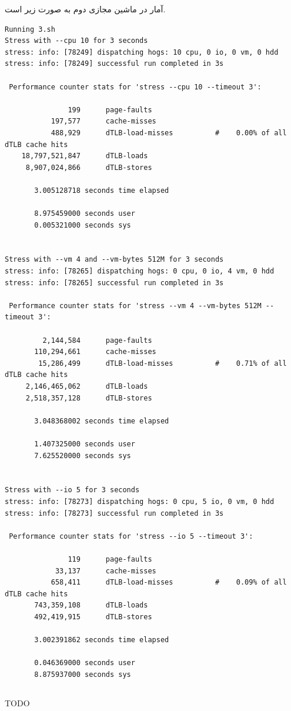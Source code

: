 \documentclass{article}
\begin{document}
آمار در ماشین مجازی دوم به صورت زیر است.
\begin{latin}
\begin{lstlisting}
Running 3.sh
Stress with --cpu 10 for 3 seconds
stress: info: [78249] dispatching hogs: 10 cpu, 0 io, 0 vm, 0 hdd
stress: info: [78249] successful run completed in 3s

 Performance counter stats for 'stress --cpu 10 --timeout 3':

               199      page-faults                                                 
           197,577      cache-misses                                                
           488,929      dTLB-load-misses          #    0.00% of all dTLB cache hits 
    18,797,521,847      dTLB-loads                                                  
     8,907,024,866      dTLB-stores                                                 

       3.005128718 seconds time elapsed

       8.975459000 seconds user
       0.005321000 seconds sys


Stress with --vm 4 and --vm-bytes 512M for 3 seconds
stress: info: [78265] dispatching hogs: 0 cpu, 0 io, 4 vm, 0 hdd
stress: info: [78265] successful run completed in 3s

 Performance counter stats for 'stress --vm 4 --vm-bytes 512M --timeout 3':

         2,144,584      page-faults                                                 
       110,294,661      cache-misses                                                
        15,286,499      dTLB-load-misses          #    0.71% of all dTLB cache hits 
     2,146,465,062      dTLB-loads                                                  
     2,518,357,128      dTLB-stores                                                 

       3.048368002 seconds time elapsed

       1.407325000 seconds user
       7.625520000 seconds sys


Stress with --io 5 for 3 seconds
stress: info: [78273] dispatching hogs: 0 cpu, 5 io, 0 vm, 0 hdd
stress: info: [78273] successful run completed in 3s

 Performance counter stats for 'stress --io 5 --timeout 3':

               119      page-faults                                                 
            33,137      cache-misses                                                
           658,411      dTLB-load-misses          #    0.09% of all dTLB cache hits 
       743,359,108      dTLB-loads                                                  
       492,419,915      dTLB-stores                                                 

       3.002391862 seconds time elapsed

       0.046369000 seconds user
       8.875937000 seconds sys
\end{lstlisting}
\end{latin}

\subsection{}
TODO
\end{document}
